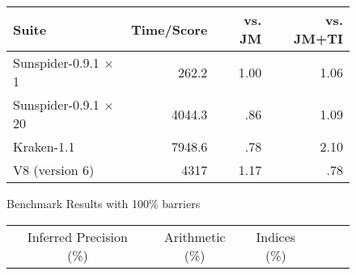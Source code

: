 \begin{figure}
\centering
\begin{tabular}{lrrr}
\toprule
Suite & Time/Score & vs. JM & vs. JM+TI \\
\midrule
Sunspider-0.9.1 $\times$1  & 262.2  & 1.00 & 1.06 \\
Sunspider-0.9.1 $\times$20 & 4044.3 & .86  & 1.09 \\
Kraken-1.1          & 7948.6 & .78  & 2.10 \\
V8 (version 6)      & 4317   & 1.17 & .78 \\
\bottomrule
\end{tabular}
\nocaptionrule \caption{Benchmark Results with 100\% barriers}
\label{fig:benchmarks100}
\end{figure}

\begin{figure*}
\centering
\begin{tabular}{lrrrrrrrrrrrrrrr}
\toprule
& \multicolumn{3}{c}{Inferred Precision (\%)} &
& \multicolumn{4}{c}{Arithmetic (\%)}
& \multicolumn{4}{c}{Indices (\%)} \\

\cmidrule(r){2-4}
\cmidrule(r){6-9}
\cmidrule{10-13}


\end{tabular}
\end{figure*}
